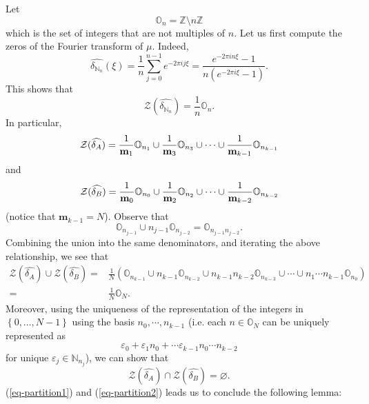\documentclass[reqno,a4paper,12pt]{amsart}
\numberwithin{equation}{section}
\newcommand{\Z}{{\mathbb Z}}
\newcommand{\N}{{\mathbb N}}
\newcommand{\Set}[1]{{\left\{{#1}\right\}}}
\theoremstyle{remark}
\numberwithin{equation}{section}
\def\N{\mathbb{N}}
\def\Z{\mathbb{Z}}
\begin{document}
Let 
$$
{\mathbb O}_n = \Z\setminus n\Z
$$
which is the set of integers that are not multiples of $n$. Let us first compute the zeros of the Fourier transform of $\mu$. Indeed, 
$$
\widehat{\delta_{\N_{n}}}(\xi) = \frac1n \sum_{j=0}^{n-1}e^{-2\pi i j\xi} = \frac{e^{-2\pi i n\xi}-1}{n(e^{-2\pi i \xi}-1)}.
$$
This shows that 
$${\mathcal Z}(\widehat{\delta_{\N_{n}}}) = \frac1n{\mathbb O}_n.
$$
In particular, $${\mathcal Z}(\widehat{\delta_A})=\frac{1}{{\bf m}_1}{\mathbb O}_{n_1}\cup\frac{1}{{\bf m}_3}{\mathbb O}_{n_3}\cup\cdots\cup\frac1{{\bf m}_{k-1}}{\mathbb O}_{n_{k-1}}$$ and
$$
{\mathcal Z}(\widehat{\delta_B})=\frac{1}{{\bf m}_0}{\mathbb O}_{n_0}\cup\frac{1}{{\bf m}_2}{\mathbb O}_{n_2}\cup\cdots\cup\frac1{{\bf m}_{k-2}}{\mathbb O}_{n_{k-2}}
$$
(notice that ${\mathbf m}_{k-1} = N$). Observe that
$$
{\mathbb O}_{n_{j-1}} \cup n_{j-1} {\mathbb O}_{n_{j-2}} = {\mathbb O}_{n_{j-1}n_{j-2}}.
$$
Combining the union into the same denominators, and iterating the above relationship, we see that 
\begin{equation}\label{eq-partition1}
\begin{aligned}
     {\mathcal Z}(\widehat{\delta_A})\cup{\mathcal Z}(\widehat{\delta_B}) = &\frac{1}{N} \left({\mathbb O}_{n_{k-1}}\cup n_{k-1}{\mathbb O}_{n_{k-2}}\cup n_{k-1}n_{k-2}{\mathbb O}_{n_{k-3}}\cup\cdots\cup n_1\cdots n_{k-1}{\mathbb O}_{n_0}\right)\\
     =& \frac{1}{N}{\mathbb O}_{N}.
\end{aligned}
\end{equation}   
Moreover, using the uniqueness of the representation of the integers in $\Set{0,\ldots,N-1}$ using the basis $n_0,\cdots, n_{k-1}$ (i.e. each $n \in{\mathbb O}_N$ can be uniquely represented as $$\varepsilon_0+\varepsilon_1 n_0+\cdots \varepsilon_{k-1}n_0\cdots n_{k-2}$$ 
for unique $\varepsilon_j\in {\mathbb N}_{n_j}$), we can show that
\begin{equation}\label{eq-partition2}{\mathcal Z}(\widehat{\delta_A})\cap{\mathcal Z}(\widehat{\delta_B})=\varnothing.\end{equation}
(\ref{eq-partition1}) and (\ref{eq-partition2}) leads us to conclude the following lemma:
\end{document}
